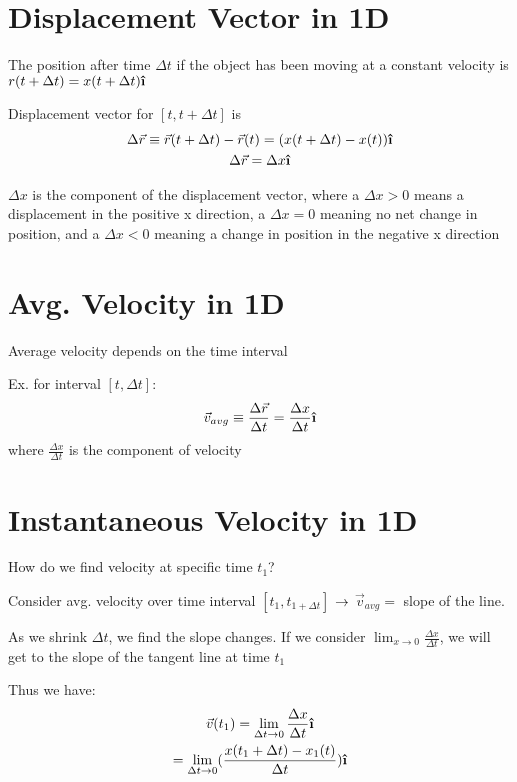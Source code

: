 \documentclass{report}
\begin{document}
\section{Displacement Vector in 1D}

The position after time $\Delta t$ if the object has been moving at a constant velocity is $r(t + \Delta t) = x(t+\Delta t) \ihat$

Displacement vector for $[t, t + \Delta t]$ is 
\begin{gather*}
\Delta \vec{r} \equiv \vec{r}(t+\Delta t) - \vec{r}(t) = (x(t + \Delta t) - x(t))\ihat\\
\Delta \vec{r} = \Delta x \ihat
\end{gather*}

$\Delta x$ is the component of the displacement vector, where a $\Delta x > 0$ means a displacement in the positive x direction, a $\Delta x = 0$ meaning no net change in position, and a $\Delta x < 0$ meaning a change in position in the negative x direction

\newpage
\section{Avg. Velocity in 1D}
Average velocity depends on the time interval

Ex. for interval $[t,\Delta t]$: 
\begin{gather*}
  \vec{v}_{avg} \equiv \frac{\Delta \vec{r}}{\Delta t} = \frac{\Delta x}{\Delta t} \ihat
\end{gather*}
where $\frac{\Delta x}{\Delta t}$ is the component of velocity 

\section{Instantaneous Velocity in 1D}
How do we find velocity at specific time $t_1$?

Consider avg. velocity over time interval $[t_1,t_{1+\Delta t}]$ $\rightarrow$ $\vec{v}_{avg} =$ slope of the line.

As we shrink $\Delta t$, we find the slope changes. If we consider $\lim_{x\to 0} \frac{\Delta x}{\Delta t}$, we will get to the slope of the tangent line at time $t_1$

Thus we have:
\begin{gather*}
  \vec{v}(t_1) = \lim_{\Delta t\to 0} \frac{\Delta x}{\Delta t} \ihat \\
  = \lim_{\dlt t \to 0} (\frac{x(t_1 + \Delta t) - x_1 (t)}{\Delta t})\ihat
\end{gather*}
\end{document}
